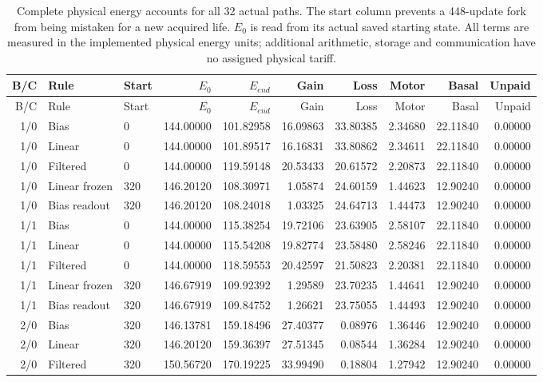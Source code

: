 \begin{longtable}{rllrrrrrrr}
\caption{Complete physical energy accounts for all 32 actual paths. The start column prevents a 448-update fork from being mistaken for a new acquired life. $E_0$ is read from its actual saved starting state. All terms are measured in the implemented physical energy units; additional arithmetic, storage and communication have no assigned physical tariff.}\label{tab:gain-costs}\\
\toprule
B/C & Rule & Start & $E_0$ & $E_{end}$ & Gain & Loss & Motor & Basal & Unpaid \\
\midrule
\endfirsthead
\toprule
B/C & Rule & Start & $E_0$ & $E_{end}$ & Gain & Loss & Motor & Basal & Unpaid \\
\midrule
\endhead
1/0 & Bias & 0 & 144.00000 & 101.82958 & 16.09863 & 33.80385 & 2.34680 & 22.11840 & 0.00000 \\
1/0 & Linear & 0 & 144.00000 & 101.89517 & 16.16831 & 33.80862 & 2.34611 & 22.11840 & 0.00000 \\
1/0 & Filtered & 0 & 144.00000 & 119.59148 & 20.53433 & 20.61572 & 2.20873 & 22.11840 & 0.00000 \\
1/0 & Linear frozen & 320 & 146.20120 & 108.30971 & 1.05874 & 24.60159 & 1.44623 & 12.90240 & 0.00000 \\
1/0 & Bias readout & 320 & 146.20120 & 108.24018 & 1.03325 & 24.64713 & 1.44473 & 12.90240 & 0.00000 \\
1/1 & Bias & 0 & 144.00000 & 115.38254 & 19.72106 & 23.63905 & 2.58107 & 22.11840 & 0.00000 \\
1/1 & Linear & 0 & 144.00000 & 115.54208 & 19.82774 & 23.58480 & 2.58246 & 22.11840 & 0.00000 \\
1/1 & Filtered & 0 & 144.00000 & 118.59553 & 20.42597 & 21.50823 & 2.20381 & 22.11840 & 0.00000 \\
1/1 & Linear frozen & 320 & 146.67919 & 109.92392 & 1.29589 & 23.70235 & 1.44641 & 12.90240 & 0.00000 \\
1/1 & Bias readout & 320 & 146.67919 & 109.84752 & 1.26621 & 23.75055 & 1.44493 & 12.90240 & 0.00000 \\
2/0 & Bias & 320 & 146.13781 & 159.18496 & 27.40377 & 0.08976 & 1.36446 & 12.90240 & 0.00000 \\
2/0 & Linear & 320 & 146.20120 & 159.36397 & 27.51345 & 0.08544 & 1.36284 & 12.90240 & 0.00000 \\
2/0 & Filtered & 320 & 150.56720 & 170.19225 & 33.99490 & 0.18804 & 1.27942 & 12.90240 & 0.00000 \\

\end{longtable}
